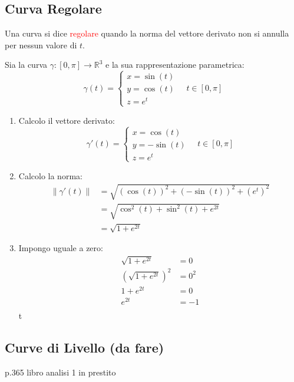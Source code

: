 \documentclass{article}  %
\begin{document}
\subsection{Curva Regolare}
Una curva si dice \textcolor{red}{regolare} quando la norma del vettore derivato non si annulla per nessun valore di $t$.
\begin{esempio}
	Sia la curva $\gamma: [0, \pi] \to \mathbb{R}^3$ e la sua rappresentazione parametrica:
	\[
		\gamma(t) = \begin{cases}
			x = \sin(t) \\
			y = \cos(t) \\
			z = e^t
		\end{cases} \quad t \in [0, \pi]
	\]
	\begin{enumerate}
		\item Calcolo il vettore derivato:
		      \[
			      \gamma'(t) = \begin{cases}
				      x = \cos(t)  \\
				      y = -\sin(t) \\
				      z = e^t
			      \end{cases} \quad t \in [0, \pi]
		      \]
		\item Calcolo la norma:
		      \begin{align*}
			      \|\gamma'(t)\|
			       & = \sqrt{(\cos(t))^2+(-\sin(t))^2+(e^t)^2} \\
			       & = \sqrt{\cos^2(t)+\sin^2(t)+e^{2t}}       \\
			       & = \sqrt{1+e^{2t}}
		      \end{align*}
		\item Impongo uguale a zero:
		      \begin{align*}
			      \sqrt{1+e^{2t}}                & = 0   \\
			      \left(\sqrt{1+e^{2t}}\right)^2 & = 0^2 \\
			      1+e^{2t}                       & = 0   \\
			      e^{2t}                         & = -1  \\
		      \end{align*}
		       t  \textcolor{green}{\checkmark}
	\end{enumerate}
\end{esempio}
\subsection{Curve di Livello (da fare)}
p.365 libro analisi 1 in prestito
\end{document}
